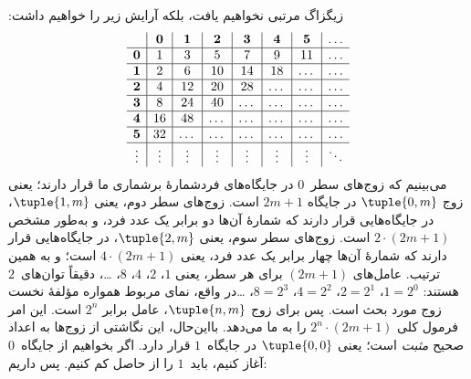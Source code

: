 {  زیگزاگ مرتبی نخواهیم یافت، بلکه آرایش زیر را خواهیم داشت:
  \[
  \begin{array}{ c | c | c | c | c | c | c | c }
  & \mathbf 0 & \mathbf 1 & \mathbf 2 & \mathbf 3 & \mathbf 4 & \mathbf 5 & \dots \\
  \hline
  \mathbf 0 & 1 & 3 & 5 & 7 & 9 & 11 & \dots \\
  \hline
  \mathbf 1 & 2 & 6 & 10 & 14 & 18 & \dots & \dots \\
  \hline
  \mathbf 2 & 4 & 12 & 20 & 28 & \dots & \dots & \dots \\
  \hline
  \mathbf 3 & 8 & 24 & 40 & \dots & \dots & \dots & \dots \\
  \hline
  \mathbf 4 & 16 & 48 & \dots & \dots & \dots & \dots & \dots \\
  \hline
  \mathbf 5 & 32 & \dots & \dots & \dots & \dots & \dots & \dots \\
  \hline
  \vdots & \vdots & \vdots & \vdots & \vdots & \vdots & \vdots & \ddots\\
  \end{array}
  \]
  می‌بینیم که زوج‌های سطر~$0$ در جایگاه‌های فردشمارهٔ برشماری ما
  قرار دارند؛ یعنی زوج $\tuple{0,m}$ در جایگاه $2m+1$ است. زوج‌های سطر
  دوم، یعنی $\tuple{1,m}$، در جایگاه‌هایی قرار دارند که شمارهٔ آن‌ها دو
  برابر یک عدد فرد، و به‌طور مشخص $2 \cdot (2m+1)$ است. زوج‌های سطر سوم،
  یعنی $\tuple{2,m}$، در جایگاه‌هایی قرار دارند که شمارهٔ آن‌ها چهار برابر
  یک عدد فرد، یعنی $4 \cdot (2m+1)$ است؛ و به همین ترتیب. عامل‌های
  $(2m+1)$ برای هر سطر، یعنی $1$، $2$، $4$، $8$، \dots، دقیقاً توان‌های~$2$
  هستند: $1= 2^0$، $2 = 2^1$، $4 = 2^2$، $8 = 2^3$، \dots\@ در واقع،
  نمای مربوط همواره مؤلفهٔ نخست زوج مورد بحث است. پس برای زوج
  $\tuple{n,m}$، عامل برابر $2^n$ است. این امر فرمول کلی
  $2^n \cdot (2m+1)$ را به ما می‌دهد. بااین‌حال، این نگاشتی از زوج‌ها به
  اعداد صحیح \emph{مثبت} است؛ یعنی $\tuple{0,0}$ در جایگاه~$1$ قرار دارد.
  اگر بخواهیم از جایگاه~$0$ آغاز کنیم، باید~$1$ را از حاصل کم کنیم. پس داریم:
 }
